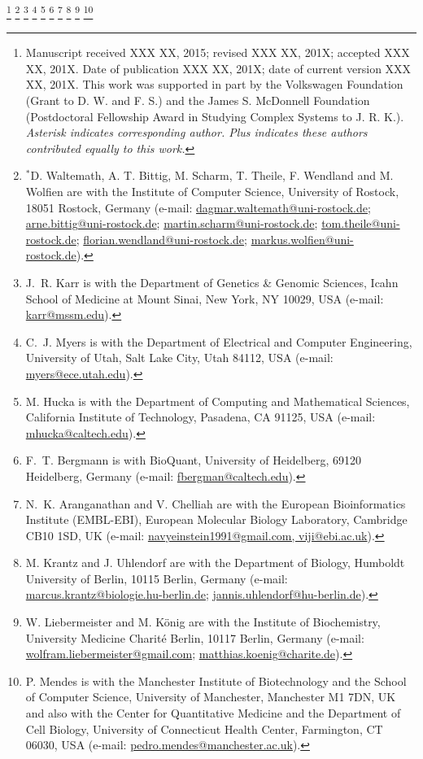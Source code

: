 \documentclass[journal,transmag]{IEEEtran}
\newcommand{\email}[1]{\href{mailto:#1}{#1}}
\begin{document}
{    \thanks{
        Manuscript received XXX XX, 2015; revised XXX XX, 201X; accepted XXX XX, 201X. Date of publication XXX XX, 201X; date of current version XXX XX, 201X.
        This work was supported in part by the Volkswagen Foundation (Grant to D. W. and F. S.) and the James S. McDonnell Foundation (Postdoctoral Fellowship Award in Studying Complex Systems to J. R. K.).
        \textit{Asterisk indicates corresponding author. Plus indicates these authors contributed equally to this work.}
    }
    \thanks{$^*$D. Waltemath, A. T. Bittig, M. Scharm, T. Theile, F. Wendland and M. Wolfien are with the Institute of Computer Science, University of Rostock, 18051 Rostock, Germany (e-mail: \email{dagmar.waltemath@uni-rostock.de}; \email{arne.bittig@uni-rostock.de}; \email{martin.scharm@uni-rostock.de}; \email{tom.theile@uni-rostock.de}; \email{florian.wendland@uni-rostock.de}; \email{markus.wolfien@uni-rostock.de}).}    
    \thanks{J.~R. Karr is with the Department of Genetics \& Genomic Sciences, Icahn School of Medicine at Mount Sinai, New York, NY 10029, USA (e-mail: \email{karr@mssm.edu}).}
    \thanks{C.~J. Myers is with the Department of Electrical and Computer Engineering, University of Utah, Salt Lake City, Utah 84112, USA (e-mail: \email{myers@ece.utah.edu}).}
    \thanks{M. Hucka is with the Department of Computing and Mathematical Sciences, California Institute of Technology, Pasadena, CA 91125, USA (e-mail: \email{mhucka@caltech.edu}).}
    \thanks{F.~T. Bergmann is with BioQuant, University of Heidelberg, 69120 Heidelberg, Germany (e-mail: \email{fbergman@caltech.edu}).} 
    \thanks{N.~K. Aranganathan and V. Chelliah are with the European Bioinformatics Institute (EMBL-EBI), European Molecular Biology Laboratory, Cambridge CB10 1SD, UK (e-mail: \email{navyeinstein1991@gmail.com, viji@ebi.ac.uk}).}   
    \thanks{M. Krantz and J. Uhlendorf are with the Department of Biology, Humboldt University of Berlin, 10115 Berlin, Germany (e-mail: \email{marcus.krantz@biologie.hu-berlin.de}; \email{jannis.uhlendorf@hu-berlin.de}).}
    \thanks{W. Liebermeister and M. K\"{o}nig are with the Institute of Biochemistry, University Medicine Charit\'{e} Berlin, 10117 Berlin, Germany (e-mail: \email{wolfram.liebermeister@gmail.com}; \email{matthias.koenig@charite.de}).}
    \thanks{P. Mendes is with the Manchester Institute of Biotechnology and the School of Computer Science, University of Manchester, Manchester M1 7DN, UK and also with the Center for Quantitative Medicine and the Department of Cell Biology, University of Connecticut Health Center, Farmington, CT 06030, USA (e-mail: \email{pedro.mendes@manchester.ac.uk}).}
}
\end{document}
